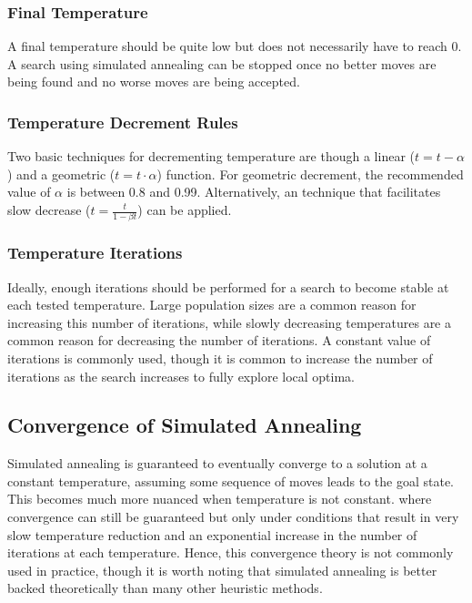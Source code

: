 \documentclass[12pt,titlepage]{article}
\begin{document}
      \subsubsection{Final Temperature}
        A final temperature should be quite low but does not necessarily have to reach 0. A search using simulated annealing can be stopped once no better moves are being found and no
        worse moves are being accepted.

      \subsubsection{Temperature Decrement Rules}
        Two basic techniques for decrementing temperature are though a linear ($t = t - \alpha$) and a geometric ($t = t \cdot \alpha$) function. For geometric decrement, the recommended
        value of $\alpha$ is between 0.8 and 0.99. Alternatively, an technique that facilitates slow decrease ($t = \frac{t}{1 - \beta t}$) can be applied.

      \subsubsection{Temperature Iterations}
        Ideally, enough iterations should be performed for a search to become stable at each tested temperature. Large population sizes are a common reason for increasing this number
        of iterations, while slowly decreasing temperatures are a common reason for decreasing the number of iterations. A constant value of iterations is commonly used, though
        it is common to increase the number of iterations as the search increases to fully explore local optima.

    \subsection{Convergence of Simulated Annealing}
      Simulated annealing is guaranteed to eventually converge to a solution at a constant temperature, assuming some sequence of moves leads to the goal state. This becomes much
      more nuanced when temperature is not constant. where convergence can still be guaranteed but only under conditions that result in very slow temperature reduction and an
      exponential increase in the number of iterations at each temperature. Hence, this convergence theory is not commonly used in practice, though it is worth noting that
      simulated annealing is better backed theoretically than many other heuristic methods.
\end{document}
